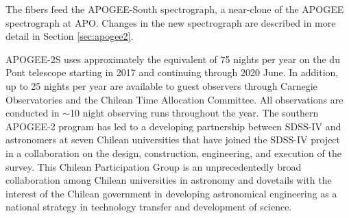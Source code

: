 The fibers feed the APOGEE-South spectrograph, a near-clone of
the APOGEE spectrograph at APO. Changes in the new spectrograph are
described in more detail in Section \ref{sec:apogee2}.

APOGEE-2S uses approximately the equivalent of 75 nights per year on
the du Pont telescope starting in 2017 and continuing through 2020
June. In addition, up to 25 nights per year are available to guest
observers through Carnegie Observatories and the Chilean Time
Allocation Committee. All observations are conducted in $\sim$10 night
observing runs throughout the year. The southern \mbox{APOGEE-2}
program has led to a developing partnership between SDSS-IV and
astronomers at seven Chilean universities that have joined the SDSS-IV
project in a collaboration on the design, construction, engineering,
and execution of the survey. This Chilean Participation Group is an
unprecedentedly broad collaboration among Chilean universities in
astronomy and dovetails with the interest of the Chilean government in
developing astronomical engineering as a national strategy in
technology transfer and development of science.
